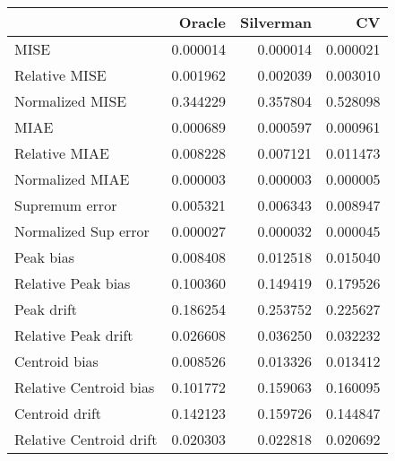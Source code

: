 \begin{tabular}{lrrr}
  \toprule
 & Oracle & Silverman & CV \\ 
  \midrule
MISE & 0.000014 & 0.000014 & 0.000021 \\ 
  Relative MISE & 0.001962 & 0.002039 & 0.003010 \\ 
  Normalized MISE & 0.344229 & 0.357804 & 0.528098 \\ 
  MIAE & 0.000689 & 0.000597 & 0.000961 \\ 
  Relative MIAE & 0.008228 & 0.007121 & 0.011473 \\ 
  Normalized MIAE & 0.000003 & 0.000003 & 0.000005 \\ 
  Supremum error & 0.005321 & 0.006343 & 0.008947 \\ 
  Normalized Sup error & 0.000027 & 0.000032 & 0.000045 \\ 
  Peak bias & 0.008408 & 0.012518 & 0.015040 \\ 
  Relative Peak bias & 0.100360 & 0.149419 & 0.179526 \\ 
  Peak drift & 0.186254 & 0.253752 & 0.225627 \\ 
  Relative Peak drift & 0.026608 & 0.036250 & 0.032232 \\ 
  Centroid bias & 0.008526 & 0.013326 & 0.013412 \\ 
  Relative Centroid bias & 0.101772 & 0.159063 & 0.160095 \\ 
  Centroid drift & 0.142123 & 0.159726 & 0.144847 \\ 
  Relative Centroid drift & 0.020303 & 0.022818 & 0.020692 \\ 
   \bottomrule
\end{tabular}
